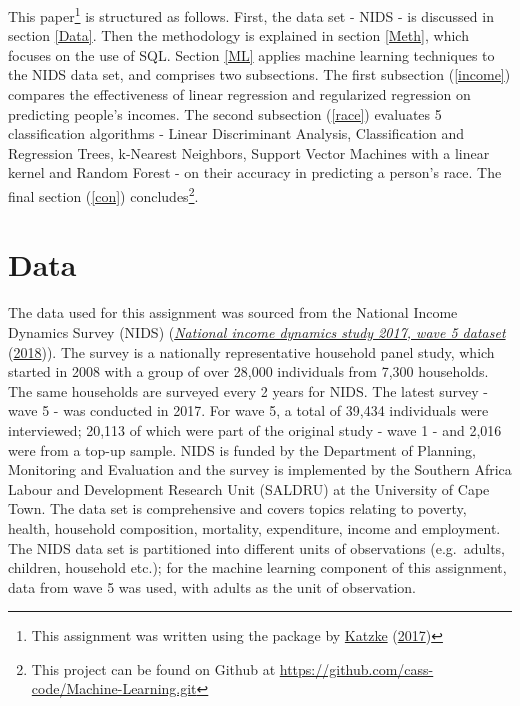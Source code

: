 \documentclass[11pt,preprint, authoryear]{elsarticle}
\numberwithin{equation}{section}
\numberwithin{figure}{section}
\numberwithin{table}{section}
\let\rmarkdownfootnote\footnote%
\def\footnote{\protect\rmarkdownfootnote}
\begin{document}
This paper\footnote{This assignment was written using the package by
  \protect\hyperlink{ref-Texevier}{Katzke}
  (\protect\hyperlink{ref-Texevier}{2017})} is structured as follows.
First, the data set - NIDS - is discussed in section \ref{Data}. Then
the methodology is explained in section \ref{Meth}, which focuses on the
use of SQL. Section \ref{ML} applies machine learning techniques to the
NIDS data set, and comprises two subsections. The first subsection
(\ref{income}) compares the effectiveness of linear regression and
regularized regression on predicting people's incomes. The second
subsection (\ref{race}) evaluates 5 classification algorithms - Linear
Discriminant Analysis, Classification and Regression Trees, k-Nearest
Neighbors, Support Vector Machines with a linear kernel and Random
Forest - on their accuracy in predicting a person's race. The final
section (\ref{con}) concludes\footnote{This project can be found on
  Github at \url{https://github.com/cass-code/Machine-Learning.git}}.

\hypertarget{data}{%
\section{\texorpdfstring{Data \label{Data}}{Data }}\label{data}}

The data used for this assignment was sourced from the National Income
Dynamics Survey (NIDS) (\protect\hyperlink{ref-nids}{\emph{National
income dynamics study 2017, wave 5 dataset}}
(\protect\hyperlink{ref-nids}{2018})). The survey is a nationally
representative household panel study, which started in 2008 with a group
of over 28,000 individuals from 7,300 households. The same households
are surveyed every 2 years for NIDS. The latest survey - wave 5 - was
conducted in 2017. For wave 5, a total of 39,434 individuals were
interviewed; 20,113 of which were part of the original study - wave 1 -
and 2,016 were from a top-up sample. NIDS is funded by the Department of
Planning, Monitoring and Evaluation and the survey is implemented by the
Southern Africa Labour and Development Research Unit (SALDRU) at the
University of Cape Town. The data set is comprehensive and covers topics
relating to poverty, health, household composition, mortality,
expenditure, income and employment. The NIDS data set is partitioned
into different units of observations (e.g.~adults, children, household
etc.); for the machine learning component of this assignment, data from
wave 5 was used, with adults as the unit of observation.
\end{document}
